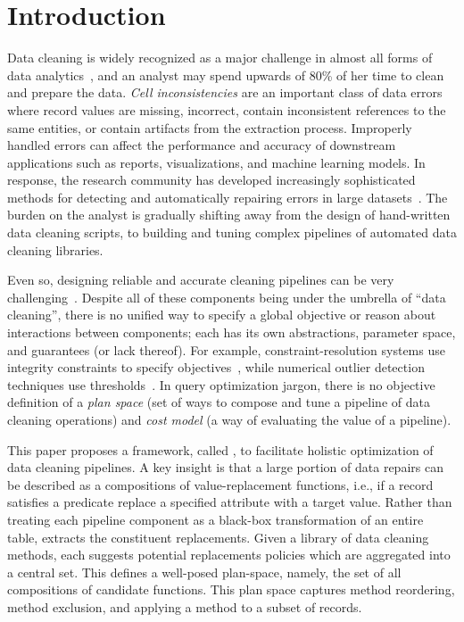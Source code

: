 \section{Introduction}\label{intro}\sloppy
Data cleaning is widely recognized as a major challenge in almost all forms of data analytics~\cite{nytimes}, and an analyst may spend upwards of 80\% of her time to clean and prepare the data. 
\emph{Cell inconsistencies} are an important class of data errors where record values are missing, incorrect, contain inconsistent references to the same entities, or contain artifacts from the extraction process.  
Improperly handled errors can affect the performance and accuracy of downstream applications such as reports, visualizations, and machine learning models.
In response, the research community has developed increasingly sophisticated methods for detecting and automatically repairing errors in large datasets~\cite{dc, rekatsinas2017holoclean, DBLP:journals/pvldb/KrishnanWWFG16, DBLP:conf/sigmod/ChuIKW16, mudgal2018deep, doan2018toward}.
The burden on the analyst is gradually shifting away from the design of hand-written data cleaning scripts, to building and tuning complex pipelines of automated data cleaning libraries.

Even so, designing reliable and accurate cleaning pipelines can be very challenging~\cite{krishnan2016hilda}.
Despite all of these components being under the umbrella of ``data cleaning'', there is no unified way to specify a global objective or reason about interactions between components; each has its own abstractions, parameter space, and guarantees (or lack thereof).
For example, constraint-resolution systems use integrity constraints to specify objectives~\cite{rekatsinas2017holoclean,DBLP:conf/sigmod/ChuIKW16}, while numerical outlier detection techniques use thresholds~\cite{bailis2016macrobase}.
In query optimization jargon, there is no objective definition of a \emph{plan space} (set of ways to compose and tune a pipeline of data cleaning operations) and \emph{cost model} (a way of evaluating the value of a pipeline).

This paper proposes a framework, called \sys, to facilitate holistic optimization of data cleaning pipelines.
A key insight is that a large portion of data repairs can be described as a compositions of value-replacement functions, i.e., if a record satisfies a predicate replace a specified attribute with a target value.
Rather than treating each pipeline component as a black-box transformation of an entire table, \sys extracts the constituent replacements.
Given a library of data cleaning methods, each suggests potential replacements policies which are aggregated into a central set.
This defines a well-posed plan-space, namely, the set of all compositions of candidate functions.
This plan space captures method reordering, method exclusion, and applying a method to a subset of records.

